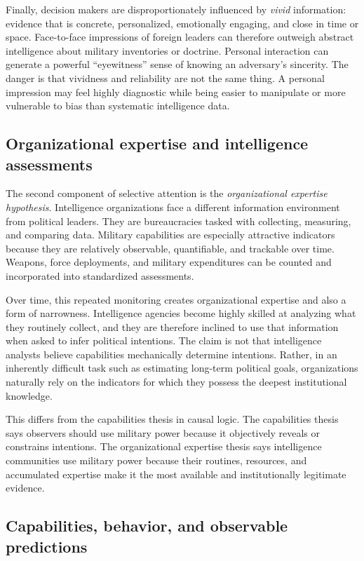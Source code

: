 Finally, decision makers are disproportionately influenced by \emph{vivid} information: evidence that is concrete, personalized, emotionally engaging, and close in time or space. Face-to-face impressions of foreign leaders can therefore outweigh abstract intelligence about military inventories or doctrine. Personal interaction can generate a powerful ``eyewitness'' sense of knowing an adversary's sincerity. The danger is that vividness and reliability are not the same thing. A personal impression may feel highly diagnostic while being easier to manipulate or more vulnerable to bias than systematic intelligence data.

\subsection{Organizational expertise and intelligence assessments}

The second component of selective attention is the \emph{organizational expertise hypothesis}. Intelligence organizations face a different information environment from political leaders. They are bureaucracies tasked with collecting, measuring, and comparing data. Military capabilities are especially attractive indicators because they are relatively observable, quantifiable, and trackable over time. Weapons, force deployments, and military expenditures can be counted and incorporated into standardized assessments.

Over time, this repeated monitoring creates organizational expertise and also a form of narrowness. Intelligence agencies become highly skilled at analyzing what they routinely collect, and they are therefore inclined to use that information when asked to infer political intentions. The claim is not that intelligence analysts believe capabilities mechanically determine intentions. Rather, in an inherently difficult task such as estimating long-term political goals, organizations naturally rely on the indicators for which they possess the deepest institutional knowledge.

This differs from the capabilities thesis in causal logic. The capabilities thesis says observers should use military power because it objectively reveals or constrains intentions. The organizational expertise thesis says intelligence communities use military power because their routines, resources, and accumulated expertise make it the most available and institutionally legitimate evidence.

\subsection{Capabilities, behavior, and observable predictions}

